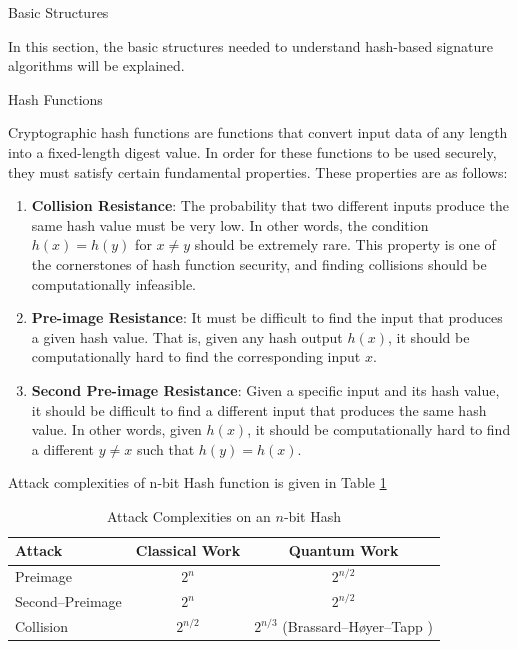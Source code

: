 \begin{section}{Basic Structures}{\label{sec1}}

In this section, the basic structures needed to understand hash-based signature algorithms will be explained.


\begin{subsection}{Hash Functions}

    Cryptographic hash functions are functions that convert input data of any length into a fixed-length digest value. In order for these functions to be used securely, they must satisfy certain fundamental properties. These properties are as follows:

    \begin{enumerate}[label=\textbf{\arabic*.}]
    \item \textbf{Collision Resistance}: The probability that two different inputs produce the same hash value must be very low. In other words, the condition \( h(x) = h(y) \) for \( x \neq y \) should be extremely rare. This property is one of the cornerstones of hash function security, and finding collisions should be computationally infeasible.

    \item \textbf{Pre-image Resistance}: It must be difficult to find the input that produces a given hash value. That is, given any hash output \( h(x) \), it should be computationally hard to find the corresponding input \( x \).

    \item \textbf{Second Pre-image Resistance}: Given a specific input and its hash value, it should be difficult to find a different input that produces the same hash value. In other words, given \( h(x) \), it should be computationally hard to find a different \( y \neq x \) such that \( h(y) = h(x) \).
    
    \end{enumerate}

Attack complexities of n-bit Hash function is given in Table \ref{tab:hash-complexities}

\begin{table}[h!]
  \centering
  \caption{Attack Complexities on an \(n\)‐bit Hash}
  \label{tab:hash-complexities}
  \begin{tabular}{|l|c|c|}
    \hline
    \textbf{Attack}            & \textbf{Classical Work} & \textbf{Quantum Work} \\ \hline
    Preimage                   & \(2^n\)                 & \(2^{n/2}\)           \\ \hline
    Second–Preimage            & \(2^n\)                 & \(2^{n/2}\)           \\ \hline
    Collision                  & \(2^{n/2}\)             & \(2^{n/3}\) (Brassard–Høyer–Tapp \cite{Brassard_1998}) \\ \hline
  \end{tabular}
\end{table}


\end{subsection}
\end{section}
